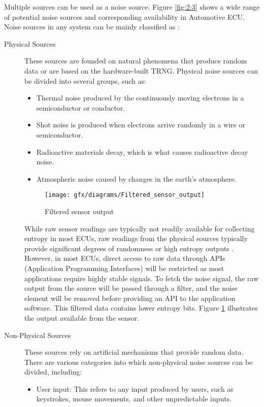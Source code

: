 Multiple sources can be used as a noise source. Figure \ref{fig:2:3} shows a wide range of potential noise sources and corresponding availability in Automotive ECU. Noise sources in any system can be mainly classified as \cite{SP90B-2018}:
\begin{description}
	\item[Physical Sources] These sources are founded on natural phenomena that produce random data or are based on the hardware-built TRNG. Physical noise sources can be divided into several groups, such as:
	\begin{itemize}
		\item Thermal noise produced by the continuously moving electrons in a semiconductor or conductor.
		
		\item Shot noise is produced when electrons arrive randomly in a wire or semiconductor.
		
		\item Radioactive materials decay, which is what causes radioactive decay noise.
		
		\item Atmospheric noise caused by changes in the earth’s atmosphere.	
	\end{itemize}
	\begin{figure}[htbp]
		\centering
		\texttt{[image: gfx/diagrams/Filtered\_sensor\_output]}
		\caption{Filtered sensor output}
		\label{fig:2:4}
	\end{figure}

	While raw sensor readings are typically not readily available for collecting entropy in most ECUs, raw readings from the physical sources typically provide significant degrees of randomness or high entropy outputs \cite{SP90B-2018}. However, in most ECUs, direct access to raw data through APIs (Application Programming Interfaces) will be restricted as most applications require highly stable signals. To fetch the noise signal, the raw output from the source will be passed through a filter, and the noise element will be removed before providing an API to the application software. This filtered data contains lower entropy bits. Figure \ref{fig:2:4} illustrates the output available from the sensor.
	
	\item[Non-Physical Sources] These sources rely on artificial mechanisms that provide random data. There are various categories into which non-physical noise sources can be divided, including:
	\begin{itemize}
		\item User input: This refers to any input produced by users, such as keystrokes, mouse movements, and other unpredictable inputs.
	

\end{itemize}
\end{description}
